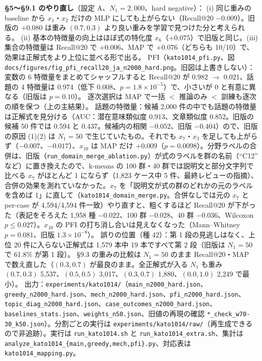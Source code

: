 \documentclass[11pt,a4paper]{jsarticle}
\begin{document}
\begin{itemize}[nosep]
    \textbf{\S 5〜\S 9.1 のやり直し}（設定 A、$N_1 = 2{,}000$、hard negative）：
    (i) 同じ重みの baseline から $x_1$・$x_2$ だけの MLP にしても上がらない（Recall@20 $-0.009$）。旧版の $+0.080$ は重み $(0.7, 0.3)$ より良い重みを学習で見つけた分と考えられる。
    (ii) 基本の特徴量の向上はほぼ式の特化度 $x_6$（$+0.075$）で旧版と同じ。(iii) 集合の特徴量は Recall@20 で $+0.006$、MAP で $+0.076$（どちらも 10/10）で、効果は正解式をより上位に並べる形で出る。
    PFI（\texttt{kato1014\_pfi.py}、図 \texttt{docs/figures/fig\_pfi\_recall20\_ja\_n2000\_hard.png}。旧図は上書きしない）：変数の 6 特徴量をまとめてシャッフルすると Recall@20 が 0.982 $\to$ 0.021、話題の 4 特徴量は 0.974（低下 0.008、$p = 1.8 \times 10^{-5}$）で、小さいが 0 と有意に異なる（旧版は $p = 0.10$）。
    逐次選択は MAP で一括 $<$ 推論のみ $<$ 訓練も逐次の順を保つ（上の主結果）。
    話題の特徴量：候補 2{,}000 件の中でも話題の特徴量は正解式を見分ける（AUC：潜在意味類似度 0.913、文章類似度 0.852。旧版の候補 50 件では 0.594 と 0.437。候補内の相関 $-0.052$、旧版 $-0.404$）ので、旧版の原因 (1)(2) は $N_1 = 50$ で生じていたもの。それでも $x_7$・$x_3$ を足しても上がらず（$-0.007$、$-0.017$）、$x_{10}$ は MAP だけ $+0.009$（$p = 0.0098$）。分野ラベルの合併は、旧版（\texttt{run\_domain\_merge\_ablation.py}）が式のラベルを群の名前（``C12'' など）に置き換えたので、k-means の 100 群・40 群では説明文と部分文字列で比べる $x_7$ がほとんど 1 にならず（1{,}823 ケース中 5 件、最終レビューの指摘）、合併の効果を測れていなかった。$x_7$ を「説明文が式の群のどれかの元のラベルを含めば 1」に直して（\texttt{kato1014\_domain\_merge.py}。合併なしでは元の $x_7$ と per-case が 4{,}594/4{,}594 件一致）やり直すと、粗くするほど Recall@20 が下がった（表記をそろえた 1{,}958 種 $-0.022$、100 群 $-0.028$、40 群 $-0.036$、Wilcoxon $p \le 0.027$）。$x_{10}$ の PFI の打ち消し合いは見えなくなった（Mann--Whitney $p = 0.081$、旧版 $1.3 \times 10^{-8}$）。
    誤りの位置（種 42）：第 1 段の見逃しはなく、上位 20 件に入らない正解式は 1{,}579 本中 19 本ですべて第 2 段（旧版は $N_1 = 50$ で 61.8\% が第 1 段）。
    \S 9.3 の重みの比較は $N_1 = 50$ のまま Recall@20・MAP で数え直した（$(0.3, 0.7)$ が最良のまま。全正解式が入る $N_1$ も重み $(0.7, 0.3)$ 5{,}537、$(0.5, 0.5)$ 3{,}017、$(0.3, 0.7)$ 1{,}880、$(0.0, 1.0)$ 2{,}249 で最小）。
    出力：\texttt{experiments/kato1014/}（\texttt{main\_n2000\_hard.json}、\texttt{greedy\_n2000\_hard.json}、\texttt{mech\_n2000\_hard.json}、\texttt{pfi\_n2000\_hard.json}、\texttt{topic\_diag\_n2000\_hard.json}、\texttt{case\_outcomes\_n2000\_hard.json}、\texttt{baselines\_stats.json}、\texttt{weights\_n50.json}、旧値の再現の確認 \texttt{*\_check\_w70-30\_k50.json}）。分割ごとの実行は \texttt{experiments/kato1014/raw/}（再生成できるので非追跡）。実行は \texttt{run\_kato1014.sh} と \texttt{run\_kato1014\_extra.sh}、集計は \texttt{analyze\_kato1014\_\{main,greedy,mech,pfi\}.py}、対応表は \texttt{kato1014\_mapping.py}。

\end{itemize}
\end{document}
